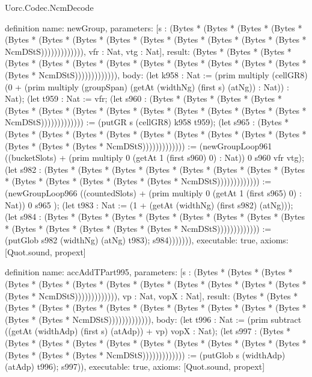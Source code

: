 \begin{lexlean}{Uorc.Codec.NcmDecode}
\begin{semanticmodule}
definition{
  name: newGroup,
  parameters: [s : (Bytes * (Bytes * (Bytes * (Bytes * (Bytes * (Bytes * (Bytes * (Bytes * (Bytes * (Bytes * (Bytes * (Bytes * (Bytes * NcmDStS))))))))))))), vfr : Nat, vtg : Nat],
  result: (Bytes * (Bytes * (Bytes * (Bytes * (Bytes * (Bytes * (Bytes * (Bytes * (Bytes * (Bytes * (Bytes * (Bytes * (Bytes * NcmDStS))))))))))))),
  body: (let k958 : Nat := (prim multiply (cellGR8) (0 + (prim multiply (groupSpan) (getAt (widthNg) (first s) (atNg)) : Nat)) : Nat); (let t959 : Nat := vfr; (let s960 : (Bytes * (Bytes * (Bytes * (Bytes * (Bytes * (Bytes * (Bytes * (Bytes * (Bytes * (Bytes * (Bytes * (Bytes * (Bytes * NcmDStS))))))))))))) := (putGR s (cellGR8) k958 t959); (let s965 : (Bytes * (Bytes * (Bytes * (Bytes * (Bytes * (Bytes * (Bytes * (Bytes * (Bytes * (Bytes * (Bytes * (Bytes * (Bytes * NcmDStS))))))))))))) := (newGroupLoop961 ((bucketSlots) + (prim multiply 0 (getAt 1 (first s960) 0) : Nat)) 0 s960 vfr vtg); (let s982 : (Bytes * (Bytes * (Bytes * (Bytes * (Bytes * (Bytes * (Bytes * (Bytes * (Bytes * (Bytes * (Bytes * (Bytes * (Bytes * NcmDStS))))))))))))) := (newGroupLoop966 ((countedSlots) + (prim multiply 0 (getAt 1 (first s965) 0) : Nat)) 0 s965 ); (let t983 : Nat := (1 + (getAt (widthNg) (first s982) (atNg))); (let s984 : (Bytes * (Bytes * (Bytes * (Bytes * (Bytes * (Bytes * (Bytes * (Bytes * (Bytes * (Bytes * (Bytes * (Bytes * (Bytes * NcmDStS))))))))))))) := (putGlob s982 (widthNg) (atNg) t983); s984))))))),
  executable: true,
  axioms: [Quot.sound, propext]
}

definition{
  name: accAddTPart995,
  parameters: [s : (Bytes * (Bytes * (Bytes * (Bytes * (Bytes * (Bytes * (Bytes * (Bytes * (Bytes * (Bytes * (Bytes * (Bytes * (Bytes * NcmDStS))))))))))))), vp : Nat, vopX : Nat],
  result: (Bytes * (Bytes * (Bytes * (Bytes * (Bytes * (Bytes * (Bytes * (Bytes * (Bytes * (Bytes * (Bytes * (Bytes * (Bytes * NcmDStS))))))))))))),
  body: (let t996 : Nat := (prim subtract ((getAt (widthAdp) (first s) (atAdp)) + vp) vopX : Nat); (let s997 : (Bytes * (Bytes * (Bytes * (Bytes * (Bytes * (Bytes * (Bytes * (Bytes * (Bytes * (Bytes * (Bytes * (Bytes * (Bytes * NcmDStS))))))))))))) := (putGlob s (widthAdp) (atAdp) t996); s997)),
  executable: true,
  axioms: [Quot.sound, propext]
}


\end{semanticmodule}
\end{lexlean}
